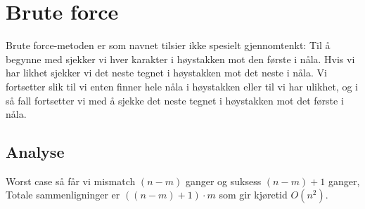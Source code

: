 \section{Brute force}
Brute force-metoden er som navnet tilsier ikke spesielt gjennomtenkt: Til å begynne med sjekker vi hver karakter i høystakken mot den første i nåla. Hvis vi har likhet sjekker vi det neste tegnet i høystakken mot det neste i nåla. Vi fortsetter slik til vi enten finner hele nåla i høystakken eller til vi har ulikhet, og i så fall fortsetter vi med å sjekke det neste tegnet i høystakken mot det første i nåla.

\subsection{Analyse}
Worst case så får vi mismatch $(n-m)$ ganger og suksess $(n-m)+1$ ganger, Totale sammenligninger er $((n-m)+1) \cdot m$ som gir kjøretid $O(n^2)$.